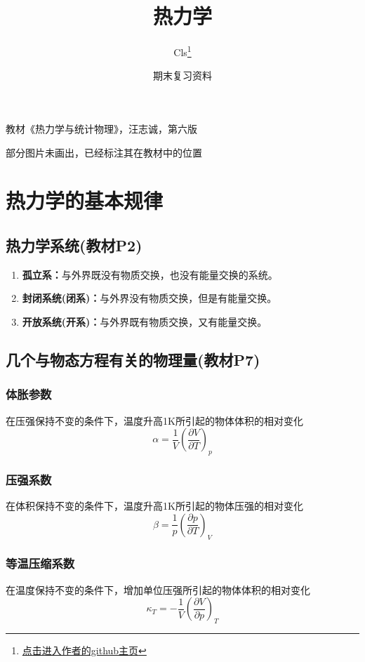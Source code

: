 \documentclass[oneside]{ctexbook}
\title{热力学}
\author{Cls\thanks{\href{https://github.com/Clignniis}{点击进入作者的github主页}}}
\date{期末复习资料}
\begin{document}
\maketitle

教材《热力学与统计物理》，汪志诚，第六版

部分图片未画出，已经标注其在教材中的位置

\tableofcontents

\chapter{热力学的基本规律}

\section{热力学系统(教材P2)}
\begin{enumerate}
    \item \textbf{孤立系：}与外界既没有物质交换，也没有能量交换的系统。
    \item \textbf{封闭系统(闭系)：}与外界没有物质交换，但是有能量交换。
    \item \textbf{开放系统(开系)：}与外界既有物质交换，又有能量交换。
\end{enumerate}

\section{几个与物态方程有关的物理量(教材P7)}

\subsection{体胀参数}

在压强保持不变的条件下，温度升高1K所引起的物体体积的相对变化
\begin{equation}
\alpha=\dfrac{1}{V}\left(\dfrac{\partial{}V}{\partial{}T}\right)_p
\end{equation}

\subsection{压强系数}

在体积保持不变的条件下，温度升高1K所引起的物体压强的相对变化
\begin{equation}
\beta=\dfrac1p\left(\dfrac{\partial{}p}{\partial{}T}\right)_V
\end{equation}

\subsection{等温压缩系数}
在温度保持不变的条件下，增加单位压强所引起的物体体积的相对变化
\begin{equation}
\kappa_T=-\dfrac{1}{V}\left(\dfrac{\partial{}V}{\partial{p}}\right)_T
\end{equation}
\end{document}
